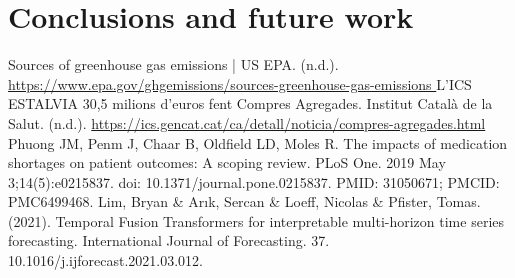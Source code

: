 \documentclass[11pt,twocolumn]{article}
\begin{document}
\section{Conclusions and future work}



\newpage
\onecolumn
\begin{thebibliography}{}
	 Sources of greenhouse gas emissions | US EPA. (n.d.). \url{https://www.epa.gov/ghgemissions/sources-greenhouse-gas-emissions }
	 L’ICS ESTALVIA 30,5 milions d’euros fent Compres Agregades. Institut Català de la Salut. (n.d.). \url{https://ics.gencat.cat/ca/detall/noticia/compres-agregades.html}
	 Phuong JM, Penm J, Chaar B, Oldfield LD, Moles R. The impacts of medication shortages on patient outcomes: A scoping review. PLoS One. 2019 May 3;14(5):e0215837. doi: 10.1371/journal.pone.0215837. PMID: 31050671; PMCID: PMC6499468.
	 Lim, Bryan \& Arık, Sercan \& Loeff, Nicolas \& Pfister, Tomas. (2021). Temporal Fusion Transformers for interpretable multi-horizon time series forecasting. International Journal of Forecasting. 37. 10.1016/j.ijforecast.2021.03.012.
\end{thebibliography}
\end{document}
